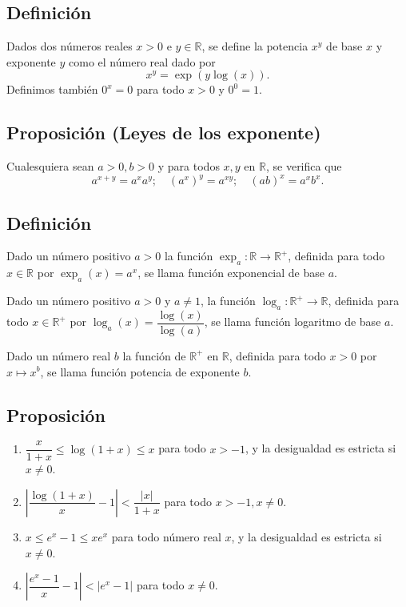 \documentclass[10pt,a4paper]{article}
\begin{document}
	\subsection{Definición}
	Dados dos números reales $x >0 $ e $y \in \mathbb{R}$, se define la potencia $x^y$ de base $x$ y exponente $y$ como el número real dado por $$x^y = \exp(y\log(x)).$$
	Definimos también $0 ^x = 0$ para todo $x > 0$ y $0^0 = 1$.
	
	\subsection{Proposición (Leyes de los exponente)}
	Cualesquiera sean $a >0, b>0$ y para todos $x, y$ en $\mathbb{R}$, se verifica que
	$$ a^{x+y} = a^xa^y; \quad (a^x)^y = a^{xy}; \quad (ab) ^x = a^xb^x.$$
	
	\subsection{Definición}
	Dado un número positivo $a >0$ la función $\exp_a: \mathbb{R} \rightarrow \mathbb{R}^+$, definida para todo $x \in \mathbb{R}$ por $\exp_a(x) = a^x$, se llama función exponencial de base $a$.
	
	Dado un número positivo $a > 0$ y $a \neq 1$, la función $\log_a : \mathbb{R}^+ \rightarrow \mathbb{R}$, definida para todo $x \in \mathbb{R}^+$ por $\log_a(x) = \dfrac{\log(x)}{\log(a)}$, se llama función logaritmo de base $a$.
	
	Dado un número real $b$ la función de $\mathbb{R}^+$ en $\mathbb{R}$, definida para todo $x>0$ por $x \mapsto x ^b$, se llama función potencia de exponente $b$.
	
	\subsection{Proposición}
	\begin{enumerate}[label=\roman*]
		\item $\dfrac{x}{1+x} \leq \log(1+x) \leq x$ para todo $x > -1$, y la desigualdad es estricta si $x \neq 0$.
		\item $\left|\dfrac{\log(1+x)}{x}-1 \right| < \dfrac{|x|}{1+x}$ para todo $x > -1, x \neq 0$.
		\item $x \leq e^x - 1 \leq xe^x$ para todo número real $x$, y la desigualdad es estricta si $x \neq 0$.
		\item $\left|\dfrac{e^x-1}{x} - 1\right| < |e^x-1|$ para todo $x \neq 0$.
	\end{enumerate}
\end{document}
